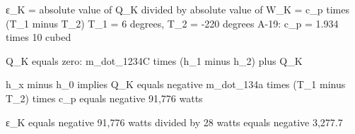 ε_K = absolute value of Q_K divided by absolute value of W_K = c_p times (T_1 minus T_2)  
T_1 = 6 degrees, T_2 = -220 degrees  
A-19: c_p = 1.934 times 10 cubed  

Q_K equals zero:  
m_dot_1234C times (h_1 minus h_2) plus Q_K  

h_x minus h_0 implies Q_K equals negative m_dot_134a times (T_1 minus T_2) times c_p equals negative 91,776 watts  

ε_K equals negative 91,776 watts divided by 28 watts equals negative 3,277.7